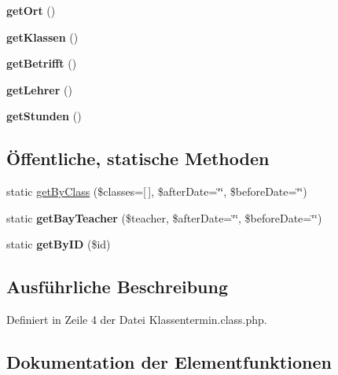 \begin{DoxyCompactItemize}
{\bfseries get\+Ort} ()
\item 
\mbox{\label{class_klassentermin_a64f1ee27e451d92e8539f0ae2c3c4fd9}} 
{\bfseries get\+Klassen} ()
\item 
\mbox{\label{class_klassentermin_acb3a2911695863baca2203b8641a349c}} 
{\bfseries get\+Betrifft} ()
\item 
\mbox{\label{class_klassentermin_a9a5ce5a983aeb8d5e3e0509f8049ace0}} 
{\bfseries get\+Lehrer} ()
\item 
\mbox{\label{class_klassentermin_ade4bdf434b92aa359edb3ccaaab99746}} 
{\bfseries get\+Stunden} ()
\end{DoxyCompactItemize}
\subsection*{Öffentliche, statische Methoden}
\begin{DoxyCompactItemize}
\item 
static \mbox{\hyperlink{class_klassentermin_a5251484dd7f9a69f2f4da3a670f74920}{get\+By\+Class}} (\$classes=\mbox{[}$\,$\mbox{]}, \$after\+Date=\char`\"{}\char`\"{}, \$before\+Date=\char`\"{}\char`\"{})
\item 
\mbox{\label{class_klassentermin_a6f2ff4323c19b5db4377b72fafcf77ce}} 
static {\bfseries get\+Bay\+Teacher} (\$teacher, \$after\+Date=\char`\"{}\char`\"{}, \$before\+Date=\char`\"{}\char`\"{})
\item 
\mbox{\label{class_klassentermin_afda9ee42113eaeb294d56d9f90dee0ee}} 
static {\bfseries get\+By\+ID} (\$id)
\end{DoxyCompactItemize}


\subsection{Ausführliche Beschreibung}


Definiert in Zeile 4 der Datei Klassentermin.\+class.\+php.



\subsection{Dokumentation der Elementfunktionen}
\mbox{\label{class_klassentermin_a5251484dd7f9a69f2f4da3a670f74920}} 
